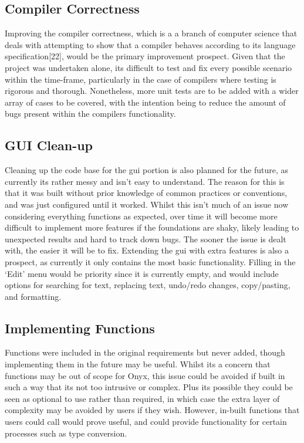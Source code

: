 \documentclass[
]{report}
\begin{document}
\subsection{Compiler Correctness}
Improving the compiler correctness, which is a a branch of computer
science that deals with attempting to show that a compiler behaves
according to its language specification{[}22{]}, would be the primary
improvement prospect. Given that the project was undertaken alone, its
difficult to test and fix every possible scenario within the time-frame,
particularly in the case of compilers where testing is rigorous and
thorough. Nonetheless, more unit tests are to be added with a wider
array of cases to be covered, with the intention being to reduce the
amount of bugs present within the compilers functionality.

\subsection{GUI Clean-up}
Cleaning up the code base for the \acrshort{gui} portion is also planned for the
future, as currently its rather messy and isn't easy to understand. The
reason for this is that it was built without prior knowledge of common
practices or conventions, and was just configured until it worked.
Whilst this isn't much of an issue now considering everything functions
as expected, over time it will become more difficult to implement more
features if the foundations are shaky, likely leading to unexpected
results and hard to track down bugs. The sooner the issue is dealt with,
the easier it will be to fix. Extending the \acrshort{gui} with extra features is
also a prospect, as currently it only contains the most basic
functionality. Filling in the `Edit' menu would be priority since it is
currently empty, and would include options for searching for text,
replacing text, undo/redo changes, copy/pasting, and formatting.

\subsection{Implementing Functions}
Functions were included in the original requirements but never added,
though implementing them in the future may be useful. Whilst its a
concern that functions may be out of scope for Onyx, this issue could be
avoided if built in such a way that its not too intrusive or complex.
Plus its possible they could be seen as optional to use rather than
required, in which case the extra layer of complexity may be avoided by
users if they wish. However, in-built functions that users could call
would prove useful, and could provide functionality for certain
processes such as type conversion.
\end{document}
